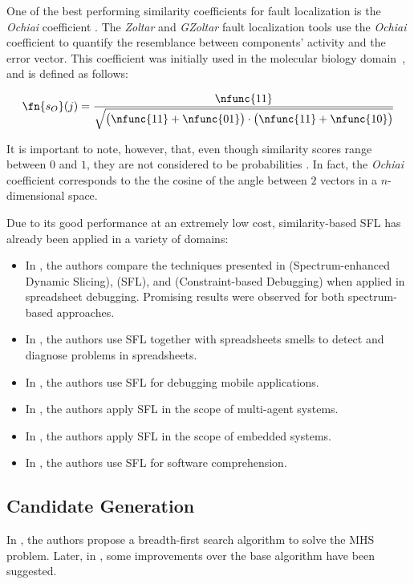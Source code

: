One of the best performing similarity coefficients for fault
localization is the \emph{Ochiai} coefficient \citep{Abreu07}.
%
The \emph{Zoltar} \citep{Janssen09} and \emph{GZoltar}
\citep{Campos12} fault localization tools use the \emph{Ochiai}
coefficient to quantify the resemblance between components' activity
and the error vector.
%
This coefficient was initially used in the molecular biology
domain~\citep{Meyer04}, and is defined as follows:

\begin{equation}
  \label{eq:related-work:ochiai}
  \fn{s_O}(j) = \frac{\nfunc{11}}{\sqrt{\big(\nfunc{11}+\nfunc{01}\big)\cdot\big(\nfunc{11}+\nfunc{10}\big)}}
\end{equation}
\noindent

It is important to note, however, that, even though similarity scores
range between $0$ and $1$, they are not considered to be
probabilities \citep{Li13}.
%
In fact, the \emph{Ochiai} coefficient corresponds to the the cosine
of the angle between $2$ vectors in a $n$-dimensional space.


Due to its good performance at an extremely low cost, similarity-based
\ac{SFL} has already been applied in a variety of domains:
\begin{itemize}[nolistsep]
\item In \citep{Hofer13}, the authors compare the techniques presented
  in \citep{Wotawa10} (Spectrum-enhanced Dynamic Slicing),
  \citep{Abreu09f} (\ac{SFL}), and \citep{Abreu12} (Constraint-based
  Debugging) when applied in spreadsheet debugging.
  Promising results were observed for both spectrum-based approaches.
\item In \citep{Abreu14}, the authors use \ac{SFL} together with
  spreadsheets smells \citep{Cunha12a,Cunha12b,Hermans12a,Hermans12b}
  to detect and diagnose problems in spreadsheets.
\item In \citep{Machado13}, the authors use \ac{SFL} for debugging
  mobile applications.
\item In \citep{Passos14,Passos15}, the authors apply \ac{SFL} in the
  scope of multi-agent systems.
\item In \citep{Zoeteweij07}, the authors apply \ac{SFL} in the scope of
  embedded systems.
\item In \citep{Perez14b}, the authors use \ac{SFL} for software
  comprehension.
\end{itemize}

\subsection*{Candidate Generation}
In \citep{Reiter87}, the authors propose a breadth-first search
algorithm to solve the \ac{MHS} problem.
%
Later, in \citep{Wotawa01,Greiner89}, some improvements over the base
algorithm have been suggested.

